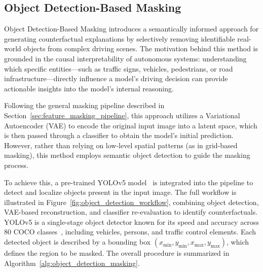 \clearpage

\subsection{Object Detection-Based Masking} \label{sec:object_detection_masking}

Object Detection-Based Masking introduces a semantically informed approach for generating counterfactual explanations by selectively removing identifiable real-world objects from complex driving scenes. The motivation behind this method is grounded in the causal interpretability of autonomous systems: understanding which specific entities—such as traffic signs, vehicles, pedestrians, or road infrastructure—directly influence a model's driving decision can provide actionable insights into the model's internal reasoning.

Following the general masking pipeline described in Section~\ref{sec:feature_masking_pipeline}, this approach utilizes a Variational Autoencoder (VAE) to encode the original input image into a latent space, which is then passed through a classifier to obtain the model’s initial prediction. However, rather than relying on low-level spatial patterns (as in grid-based masking), this method employs semantic object detection to guide the masking process.

To achieve this, a pre-trained YOLOv5 model~\cite{jocher2020yolov5} is integrated into the pipeline to detect and localize objects present in the input image. The full workflow is illustrated in Figure~\ref{fig:object_detection_workflow}, combining object detection, VAE-based reconstruction, and classifier re-evaluation to identify counterfactuals. YOLOv5 is a single-stage object detector known for its speed and accuracy across 80 COCO classes~\cite{lin2015microsoftcococommonobjects}, including vehicles, persons, and traffic control elements. Each detected object is described by a bounding box $(x_{\min}, y_{\min}, x_{\max}, y_{\max})$, which defines the region to be masked. The overall procedure is summarized in Algorithm~\ref{alg:object_detection_masking}.

